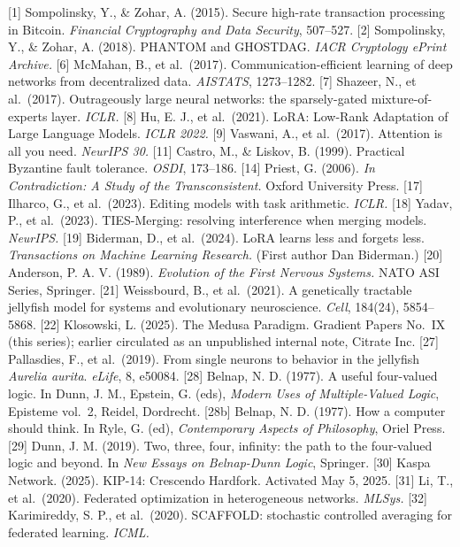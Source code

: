{[}1{]} Sompolinsky, Y., \& Zohar, A. (2015). Secure high-rate
transaction processing in Bitcoin. \emph{Financial Cryptography and Data
Security}, 507--527. {[}2{]} Sompolinsky, Y., \& Zohar, A. (2018).
PHANTOM and GHOSTDAG. \emph{IACR Cryptology ePrint Archive.} {[}6{]}
McMahan, B., et al.~(2017). Communication-efficient learning of deep
networks from decentralized data. \emph{AISTATS}, 1273--1282. {[}7{]}
Shazeer, N., et al.~(2017). Outrageously large neural networks: the
sparsely-gated mixture-of-experts layer. \emph{ICLR.} {[}8{]} Hu, E. J.,
et al.~(2021). LoRA: Low-Rank Adaptation of Large Language Models.
\emph{ICLR 2022.} {[}9{]} Vaswani, A., et al.~(2017). Attention is all
you need. \emph{NeurIPS 30.} {[}11{]} Castro, M., \& Liskov, B. (1999).
Practical Byzantine fault tolerance. \emph{OSDI}, 173--186. {[}14{]}
Priest, G. (2006). \emph{In Contradiction: A Study of the
Transconsistent.} Oxford University Press. {[}17{]} Ilharco, G., et
al.~(2023). Editing models with task arithmetic. \emph{ICLR.} {[}18{]}
Yadav, P., et al.~(2023). TIES-Merging: resolving interference when
merging models. \emph{NeurIPS.} {[}19{]} Biderman, D., et al.~(2024).
LoRA learns less and forgets less. \emph{Transactions on Machine
Learning Research.} (First author Dan Biderman.) {[}20{]} Anderson, P.
A. V. (1989). \emph{Evolution of the First Nervous Systems.} NATO ASI
Series, Springer. {[}21{]} Weissbourd, B., et al.~(2021). A genetically
tractable jellyfish model for systems and evolutionary neuroscience.
\emph{Cell}, 184(24), 5854--5868. {[}22{]} Klosowski, L. (2025). The
Medusa Paradigm. Gradient Papers No.~IX (this series); earlier
circulated as an unpublished internal note, Citrate Inc. {[}27{]}
Pallasdies, F., et al.~(2019). From single neurons to behavior in the
jellyfish \emph{Aurelia aurita}. \emph{eLife}, 8, e50084. {[}28{]}
Belnap, N. D. (1977). A useful four-valued logic. In Dunn, J. M.,
Epstein, G. (eds), \emph{Modern Uses of Multiple-Valued Logic}, Episteme
vol.~2, Reidel, Dordrecht. {[}28b{]} Belnap, N. D. (1977). How a
computer should think. In Ryle, G. (ed), \emph{Contemporary Aspects of
Philosophy}, Oriel Press. {[}29{]} Dunn, J. M. (2019). Two, three, four,
infinity: the path to the four-valued logic and beyond. In \emph{New
Essays on Belnap-Dunn Logic}, Springer. {[}30{]} Kaspa Network. (2025).
KIP-14: Crescendo Hardfork. Activated May 5, 2025. {[}31{]} Li, T., et
al.~(2020). Federated optimization in heterogeneous networks.
\emph{MLSys.} {[}32{]} Karimireddy, S. P., et al.~(2020). SCAFFOLD:
stochastic controlled averaging for federated learning. \emph{ICML.}
